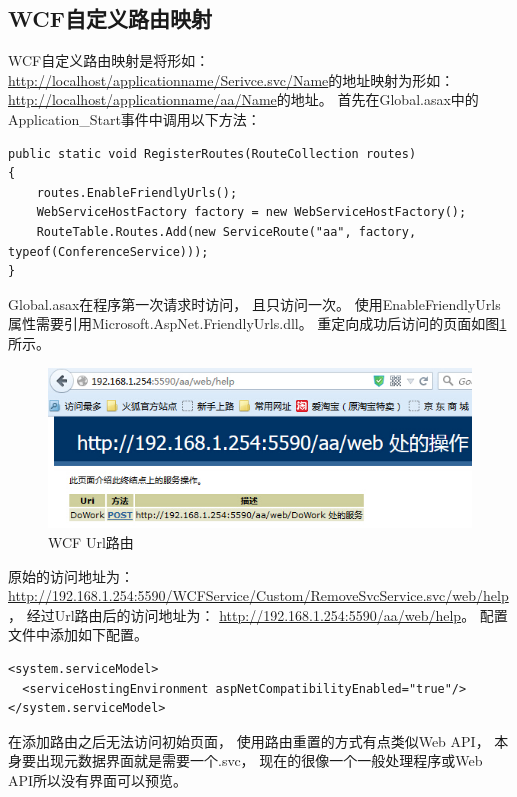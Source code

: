 \documentclass{book}
\begin{document}
\subsection{WCF自定义路由映射}

WCF自定义路由映射是将形如：
\url{http://localhost/applicationname/Serivce.svc/Name}的地址映射为形如：
\url{http://localhost/applicationname/aa/Name}的地址。
首先在Global.asax中的Application\_Start事件中调用以下方法：

\begin{lstlisting}[language={[Sharp]C}]
public static void RegisterRoutes(RouteCollection routes)
{
    routes.EnableFriendlyUrls();
    WebServiceHostFactory factory = new WebServiceHostFactory();
    RouteTable.Routes.Add(new ServiceRoute("aa", factory, typeof(ConferenceService)));
}
\end{lstlisting}

Global.asax在程序第一次请求时访问，
且只访问一次。
使用EnableFriendlyUrls属性需要引用Microsoft.AspNet.FriendlyUrls.dll。
重定向成功后访问的页面如图\ref{fig:WCFRESTRedictUrl}所示。

\begin{figure}[htbp]
	\centering
	\includegraphics[scale=0.8]{WCFRESTRedictUrl.jpg}
	\caption{WCF Url路由}
	\label{fig:WCFRESTRedictUrl}
\end{figure}

原始的访问地址为：
\url{http://192.168.1.254:5590/WCFService/Custom/RemoveSvcService.svc/web/help}，
经过Url路由后的访问地址为：
\url{http://192.168.1.254:5590/aa/web/help}。
配置文件中添加如下配置。

\begin{lstlisting}
<system.serviceModel>
  <serviceHostingEnvironment aspNetCompatibilityEnabled="true"/>
</system.serviceModel>
\end{lstlisting}

在添加路由之后无法访问初始页面，
使用路由重置的方式有点类似Web API， 
本身要出现元数据界面就是需要一个.svc，
现在的很像一个一般处理程序或Web API所以没有界面可以预览。
\end{document}
